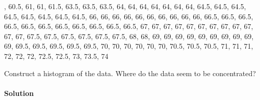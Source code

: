\documentclass[letterpaper,10pt,english]{jupyterBook}
\begin{document}
, 60.5, 61, 61, 61.5, 63.5, 63.5, 63.5, 64, 64, 64, 64, 64, 64, 64, 64.5, 64.5, 64.5, 64.5, 64.5, 64.5, 64.5, 64.5, 66, 66, 66, 66, 66, 66, 66, 66, 66, 66, 66.5, 66.5, 66.5, 66.5, 66.5, 66.5, 66.5,    66.5, 66.5, 66.5, 66.5, 67, 67, 67, 67, 67, 67, 67, 67, 67, 67, 67, 67, 67.5, 67.5, 67.5, 67.5, 67.5, 67.5, 68, 68, 69, 69, 69, 69, 69, 69, 69, 69, 69, 69, 69.5, 69.5, 69.5, 69.5, 69.5, 70, 70, 70, 70, 70, 70, 70.5, 70.5, 70.5, 71, 71, 71, 72, 72, 72, 72.5, 72.5, 73, 73.5, 74

\sphinxAtStartPar
Construct a histogram of the data. Where do the data seem to be concentrated?


\paragraph{Solution}
\label{\detokenize{Ch1 Sampling and Data/1.4 Tables and Charts:id9}}
\end{document}
